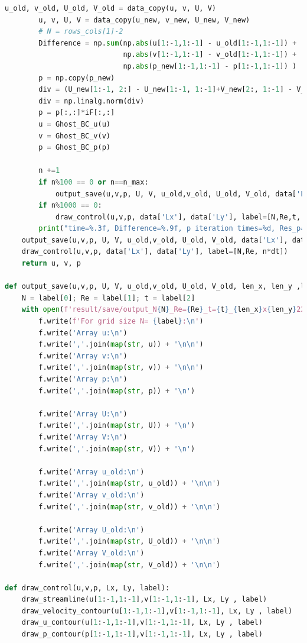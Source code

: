 \documentclass[12pt]{article}
\begin{document}
\begin{scriptsize}
\begin{lstlisting}[language=python,caption={N-S Cylinder Solver}]
        u_old, v_old, U_old, V_old = data_copy(u, v, U, V)
        u, v, U, V = data_copy(u_new, v_new, U_new, V_new)
        # N = rows_cols[1]-2
        Difference = np.sum(np.abs(u[1:-1,1:-1] - u_old[1:-1,1:-1]) + 
                            np.abs(v[1:-1,1:-1] - v_old[1:-1,1:-1]) + 
                            np.abs(p_new[1:-1,1:-1] - p[1:-1,1:-1]) )
        p = np.copy(p_new)
        div = (U_new[1:-1, 2:] - U_new[1:-1, 1:-1]+V_new[2:, 1:-1] - V_new[1:-1, 1:-1])/dx
        div = np.linalg.norm(div)
        p = p[:,:]*iF[:,:]
        u = Ghost_BC_u(u)
        v = Ghost_BC_v(v)
        p = Ghost_BC_p(p)

        n +=1
        if n%100 == 0 or n==n_max:
            output_save(u,v,p, U, V, u_old,v_old, U_old, V_old, data['Lx'], data['Ly'] ,label=[N,Re,n*dt])
        if n%1000 == 0:
            draw_control(u,v,p, data['Lx'], data['Ly'], label=[N,Re,t, n*dt])
        print("time=%.3f, Difference=%.9f, p iteration times=%d, Res_p=%f, div=%.2f "%((n+1)*dt,Difference,k,Resp, div))
    output_save(u,v,p, U, V, u_old,v_old, U_old, V_old, data['Lx'], data['Ly'] ,label=[N,Re,n*dt])
    draw_control(u,v,p, data['Lx'], data['Ly'], label=[N,Re, n*dt])
    return u, v, p

def output_save(u,v,p, U, V, u_old,v_old, U_old, V_old, len_x, len_y ,label):
    N = label[0]; Re = label[1]; t = label[2]
    with open(f'result/save/output_N{N}_Re={Re}_t={t}_{len_x}x{len_y}222.txt', 'w') as f:
        f.write(f'For grid size N= {label}:\n')
        f.write('Array u:\n')
        f.write(','.join(map(str, u)) + '\n\n') 
        f.write('Array v:\n')  
        f.write(','.join(map(str, v)) + '\n\n')  
        f.write('Array p:\n')  
        f.write(','.join(map(str, p)) + '\n')  

        f.write('Array U:\n')  
        f.write(','.join(map(str, U)) + '\n')  
        f.write('Array V:\n')  
        f.write(','.join(map(str, V)) + '\n') 

        f.write('Array u_old:\n')  
        f.write(','.join(map(str, u_old)) + '\n\n')  
        f.write('Array v_old:\n')  
        f.write(','.join(map(str, v_old)) + '\n\n')  

        f.write('Array U_old:\n')  
        f.write(','.join(map(str, U_old)) + '\n\n')  
        f.write('Array V_old:\n')  
        f.write(','.join(map(str, V_old)) + '\n\n')  

def draw_control(u,v,p, Lx, Ly, label):
    draw_streamline(u[1:-1,1:-1],v[1:-1,1:-1], Lx, Ly , label)
    draw_velocity_contour(u[1:-1,1:-1],v[1:-1,1:-1], Lx, Ly , label)
    draw_u_contour(u[1:-1,1:-1],v[1:-1,1:-1], Lx, Ly , label)
    draw_p_contour(p[1:-1,1:-1],v[1:-1,1:-1], Lx, Ly , label)


\end{lstlisting}
\end{scriptsize}
\end{document}
